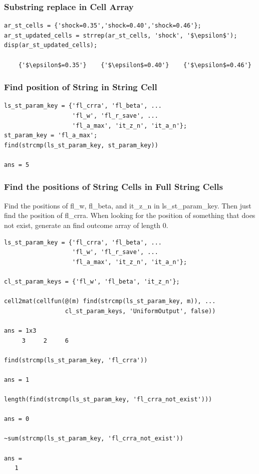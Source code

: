 \documentclass[
]{book}
\begin{document}
\hypertarget{substring-replace-in-cell-array}{%
\subsubsection{Substring replace in Cell Array}\label{substring-replace-in-cell-array}}

\begin{verbatim}
ar_st_cells = {'shock=0.35','shock=0.40','shock=0.46'};
ar_st_updated_cells = strrep(ar_st_cells, 'shock', '$\epsilon$');
disp(ar_st_updated_cells);

    {'$\epsilon$=0.35'}    {'$\epsilon$=0.40'}    {'$\epsilon$=0.46'}
\end{verbatim}

\hypertarget{find-position-of-string-in-string-cell}{%
\subsubsection{Find position of String in String Cell}\label{find-position-of-string-in-string-cell}}

\begin{verbatim}
ls_st_param_key = {'fl_crra', 'fl_beta', ...
                   'fl_w', 'fl_r_save', ...
                   'fl_a_max', 'it_z_n', 'it_a_n'};
st_param_key = 'fl_a_max';
find(strcmp(ls_st_param_key, st_param_key))

ans = 5
\end{verbatim}

\hypertarget{find-the-positions-of-string-cells-in-full-string-cells}{%
\subsubsection{Find the positions of String Cells in Full String Cells}\label{find-the-positions-of-string-cells-in-full-string-cells}}

Find the positions of fl\_w, fl\_beta, and it\_z\_n in
ls\_st\_param\_key. Then just find the position of fl\_crra. When
looking for the position of something that does not exist, generate an
find outcome array of length 0.

\begin{verbatim}
ls_st_param_key = {'fl_crra', 'fl_beta', ...
                   'fl_w', 'fl_r_save', ...
                   'fl_a_max', 'it_z_n', 'it_a_n'};

cl_st_param_keys = {'fl_w', 'fl_beta', 'it_z_n'};

cell2mat(cellfun(@(m) find(strcmp(ls_st_param_key, m)), ...
                 cl_st_param_keys, 'UniformOutput', false))

ans = 1x3    
     3     2     6

find(strcmp(ls_st_param_key, 'fl_crra'))

ans = 1

length(find(strcmp(ls_st_param_key, 'fl_crra_not_exist')))

ans = 0

~sum(strcmp(ls_st_param_key, 'fl_crra_not_exist'))

ans = 
   1
\end{verbatim}
\end{document}
